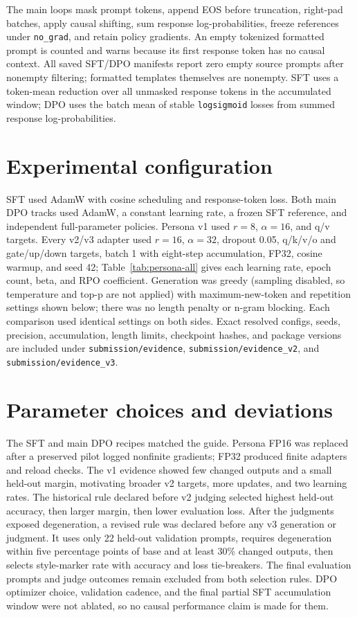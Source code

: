 \documentclass[10pt,a4paper]{article}
\begin{document}
The main loops mask prompt tokens, append EOS before truncation, right-pad batches, apply causal shifting, sum response log-probabilities, freeze references under \texttt{no\_grad}, and retain policy gradients. An empty tokenized formatted prompt is counted and warns because its first response token has no causal context. All saved SFT/DPO manifests report zero empty source prompts after nonempty filtering; formatted templates themselves are nonempty.
SFT uses a token-mean reduction over all unmasked response tokens in the accumulated window; DPO uses the batch mean of stable \texttt{logsigmoid} losses from summed response log-probabilities.

\section{Experimental configuration}
SFT used AdamW with cosine scheduling and response-token loss. Both main DPO tracks used AdamW, a constant learning rate, a frozen SFT reference, and independent full-parameter policies. Persona v1 used $r=8$, $\alpha=16$, and q/v targets. Every v2/v3 adapter used $r=16$, $\alpha=32$, dropout 0.05, q/k/v/o and gate/up/down targets, batch 1 with eight-step accumulation, FP32, cosine warmup, and seed 42; Table~\ref{tab:persona-all} gives each learning rate, epoch count, beta, and RPO coefficient. Generation was greedy (sampling disabled, so temperature and top-p are not applied) with maximum-new-token and repetition settings shown below; there was no length penalty or n-gram blocking. Each comparison used identical settings on both sides. Exact resolved configs, seeds, precision, accumulation, length limits, checkpoint hashes, and package versions are included under \texttt{submission/evidence}, \texttt{submission/evidence\_v2}, and \texttt{submission/evidence\_v3}.


\section{Parameter choices and deviations}
The SFT and main DPO recipes matched the guide. Persona FP16 was replaced after a preserved pilot logged nonfinite gradients; FP32 produced finite adapters and reload checks. The v1 evidence showed few changed outputs and a small held-out margin, motivating broader v2 targets, more updates, and two learning rates. The historical rule declared before v2 judging selected highest held-out accuracy, then larger margin, then lower evaluation loss. After the judgments exposed degeneration, a revised rule was declared before any v3 generation or judgment. It uses only 22 held-out validation prompts, requires degeneration within five percentage points of base and at least 30\% changed outputs, then selects style-marker rate with accuracy and loss tie-breakers. The final evaluation prompts and judge outcomes remain excluded from both selection rules. DPO optimizer choice, validation cadence, and the final partial SFT accumulation window were not ablated, so no causal performance claim is made for them.
\end{document}
